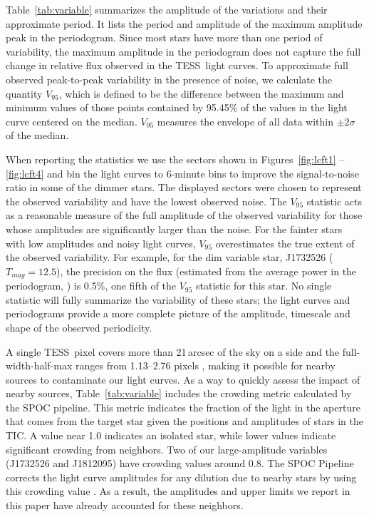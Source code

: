 \documentclass[twocolumn]{aastex631}
\newcommand{\tess}{TESS}
\begin{document}
Table~\ref{tab:variable} summarizes the amplitude of the variations and their approximate period.  It lists the period and amplitude of the maximum amplitude peak in the periodogram. Since most stars have more than one period of variability, the maximum amplitude in the periodogram does not capture the full change in relative flux observed in the \tess\ light curves. To approximate full observed peak-to-peak variability in the presence of noise, we calculate the quantity $V_{95}$, which is defined to be the difference between the maximum and minimum values of those points contained by 95.45\% of the values in the light curve centered on the median.  $V_{95}$ measures the envelope of all data within $\pm 2\sigma$ of the median. 


When reporting the statistics we use the sectors shown in Figures~\ref{fig:lcft1} -- \ref{fig:lcft4} and bin the light curves to 6-minute bins to improve the signal-to-noise ratio in some of the dimmer stars. The displayed sectors were chosen to represent the observed variability and have the lowest observed noise. The $V_{95}$ statistic acts as a reasonable measure of the full amplitude of the observed variability for those whose amplitudes are significantly larger than the noise.  For the fainter stars with low amplitudes and noisy light curves, $V_{95}$ overestimates the true extent of the observed variability. For example, for the dim variable star, J1732526 ($T_{mag}=12.5$), the precision on the flux (estimated from the average power in the periodogram, \citealt{KjeldsenBedding1995}) is 0.5\%, one fifth of the $V_{95}$ statistic for this star.  No single statistic will fully summarize the variability of these stars; the light curves and periodograms provide a more complete picture of the amplitude, timescale and shape of the observed periodicity.

A single \tess\ pixel covers more than 21\,arcsec of the sky on a side and the full-width-half-max ranges from 1.13--2.76 pixels \citep{oelkers2018}, making it possible for nearby sources to contaminate our light curves. As a way to quickly assess the impact of nearby sources, Table~\ref{tab:variable} includes the crowding metric calculated by the SPOC pipeline.  This metric indicates the fraction of the light in the aperture that comes from the target star given the positions and amplitudes of stars in the TIC.  A value near 1.0 indicates an isolated star, while lower values indicate significant crowding from neighbors.  Two of our large-amplitude variables (J1732526 and J1812095) have crowding values around 0.8.  The SPOC Pipeline corrects the light curve amplitudes for any dilution due to nearby stars by using this crowding value \citep{FausnaughDRN}.  As a result, the amplitudes and upper limits we report in this paper have already accounted for these neighbors.
\end{document}
